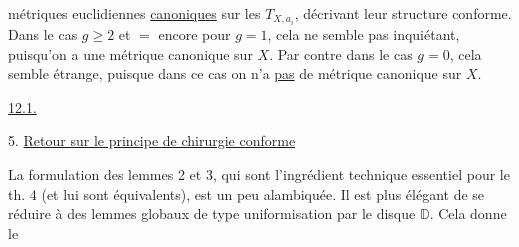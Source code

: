 métriques euclidiennes \uline{canoniques} sur
les $T_{X,a_i}$, décrivant leur structure
conforme. Dans le cas $g\geq 2$ et $=$
encore pour $g=1$, cela ne semble pas
inquiétant, puisqu'on a une
métrique canonique sur $X$. Par
contre dans le cas $g=0$, cela semble
étrange, puisque dans ce cas on n'a
\uline{pas} de métrique canonique sur $X$.

\uline{12.1.}

5. \uline{Retour sur le principe de chirurgie conforme}

La formulation des lemmes  2 et 3, qui
sont l'ingrédient technique essentiel pour le
th. 4 (et lui sont équivalents), est un peu
alambiquée. Il est plus élégant de se
réduire à des lemmes globaux de type
uniformisation par le disque $\mathbb{D}$. Cela
donne le
